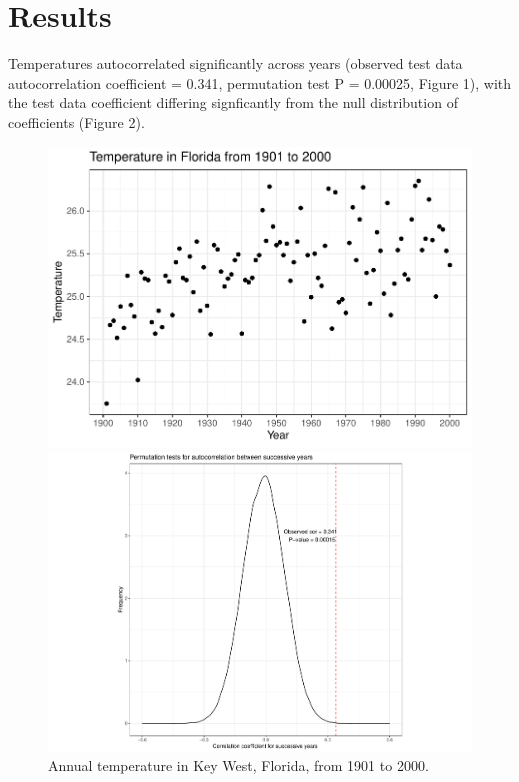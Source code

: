 \documentclass{article}
\begin{document}
\section{Results \vspace{-0.5em}}

Temperatures autocorrelated significantly across years (observed test data autocorrelation coefficient = 0.341, permutation test P = 0.00025, Figure 1), with the test data coefficient differing signficantly from the null distribution of coefficients (Figure 2). \vspace{-0.5em}

    \begin{figure}[htbp]
    \centering
    \begin{minipage}{.5\textwidth}
        \centering
        \includegraphics[scale=0.4]{DistributionFlorida.pdf}
        \caption{Annual temperature in Key West, Florida, \newline from 1901 to 2000.} 
        \label{fig.test1}
    \end{minipage}%
    \begin{minipage}{.5\textwidth}
        \centering
        \includegraphics[scale=0.4]{PermuCorCoeff_TAutoCorr.pdf}

\end{minipage}
\end{figure}
\end{document}
